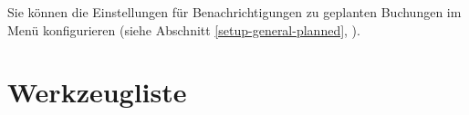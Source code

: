 Sie können die Einstellungen für Benachrichtigungen zu geplanten Buchungen im Menü  konfigurieren (siehe Abschnitt \vref{setup-general-planned}, ).


\section{Werkzeugliste\label{plannedtransactions-functions}}

